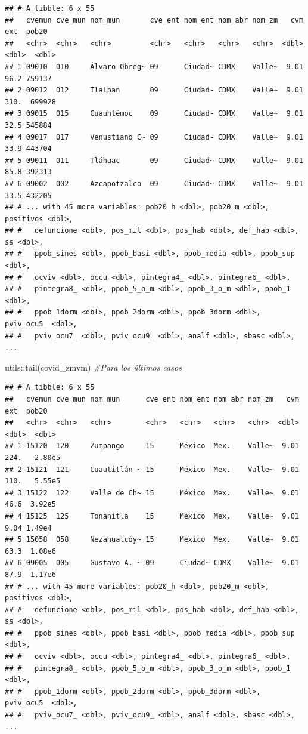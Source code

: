 \documentclass[
  11pt,
  oneside]{book}
\newenvironment{Shaded}{\begin{snugshade}}{\end{snugshade}}
\newcommand{\CommentTok}[1]{\textcolor[rgb]{0.56,0.35,0.01}{\textit{#1}}}
\newcommand{\FunctionTok}[1]{\textcolor[rgb]{0.00,0.00,0.00}{#1}}
\newcommand{\NormalTok}[1]{#1}
\newcommand{\SpecialCharTok}[1]{\textcolor[rgb]{0.00,0.00,0.00}{#1}}
\begin{document}
\begin{verbatim}
## # A tibble: 6 x 55
##   cvemun cve_mun nom_mun       cve_ent nom_ent nom_abr nom_zm   cvm   ext  pob20
##   <chr>  <chr>   <chr>         <chr>   <chr>   <chr>   <chr>  <dbl> <dbl>  <dbl>
## 1 09010  010     Álvaro Obreg~ 09      Ciudad~ CDMX    Valle~  9.01  96.2 759137
## 2 09012  012     Tlalpan       09      Ciudad~ CDMX    Valle~  9.01 310.  699928
## 3 09015  015     Cuauhtémoc    09      Ciudad~ CDMX    Valle~  9.01  32.5 545884
## 4 09017  017     Venustiano C~ 09      Ciudad~ CDMX    Valle~  9.01  33.9 443704
## 5 09011  011     Tláhuac       09      Ciudad~ CDMX    Valle~  9.01  85.8 392313
## 6 09002  002     Azcapotzalco  09      Ciudad~ CDMX    Valle~  9.01  33.5 432205
## # ... with 45 more variables: pob20_h <dbl>, pob20_m <dbl>, positivos <dbl>,
## #   defuncione <dbl>, pos_mil <dbl>, pos_hab <dbl>, def_hab <dbl>, ss <dbl>,
## #   ppob_sines <dbl>, ppob_basi <dbl>, ppob_media <dbl>, ppob_sup <dbl>,
## #   ocviv <dbl>, occu <dbl>, pintegra4_ <dbl>, pintegra6_ <dbl>,
## #   pintegra8_ <dbl>, ppob_5_o_m <dbl>, ppob_3_o_m <dbl>, ppob_1 <dbl>,
## #   ppob_1dorm <dbl>, ppob_2dorm <dbl>, ppob_3dorm <dbl>, pviv_ocu5_ <dbl>,
## #   pviv_ocu7_ <dbl>, pviv_ocu9_ <dbl>, analf <dbl>, sbasc <dbl>, ...
\end{verbatim}

\begin{Shaded}
\begin{Highlighting}[]
\NormalTok{utils}\SpecialCharTok{::}\FunctionTok{tail}\NormalTok{(covid\_zmvm) }\CommentTok{\#Para los últimos casos}
\end{Highlighting}
\end{Shaded}

\begin{verbatim}
## # A tibble: 6 x 55
##   cvemun cve_mun nom_mun      cve_ent nom_ent nom_abr nom_zm   cvm    ext  pob20
##   <chr>  <chr>   <chr>        <chr>   <chr>   <chr>   <chr>  <dbl>  <dbl>  <dbl>
## 1 15120  120     Zumpango     15      México  Mex.    Valle~  9.01 224.   2.80e5
## 2 15121  121     Cuautitlán ~ 15      México  Mex.    Valle~  9.01 110.   5.55e5
## 3 15122  122     Valle de Ch~ 15      México  Mex.    Valle~  9.01  46.6  3.92e5
## 4 15125  125     Tonanitla    15      México  Mex.    Valle~  9.01   9.04 1.49e4
## 5 15058  058     Nezahualcóy~ 15      México  Mex.    Valle~  9.01  63.3  1.08e6
## 6 09005  005     Gustavo A. ~ 09      Ciudad~ CDMX    Valle~  9.01  87.9  1.17e6
## # ... with 45 more variables: pob20_h <dbl>, pob20_m <dbl>, positivos <dbl>,
## #   defuncione <dbl>, pos_mil <dbl>, pos_hab <dbl>, def_hab <dbl>, ss <dbl>,
## #   ppob_sines <dbl>, ppob_basi <dbl>, ppob_media <dbl>, ppob_sup <dbl>,
## #   ocviv <dbl>, occu <dbl>, pintegra4_ <dbl>, pintegra6_ <dbl>,
## #   pintegra8_ <dbl>, ppob_5_o_m <dbl>, ppob_3_o_m <dbl>, ppob_1 <dbl>,
## #   ppob_1dorm <dbl>, ppob_2dorm <dbl>, ppob_3dorm <dbl>, pviv_ocu5_ <dbl>,
## #   pviv_ocu7_ <dbl>, pviv_ocu9_ <dbl>, analf <dbl>, sbasc <dbl>, ...
\end{verbatim}
\end{document}

